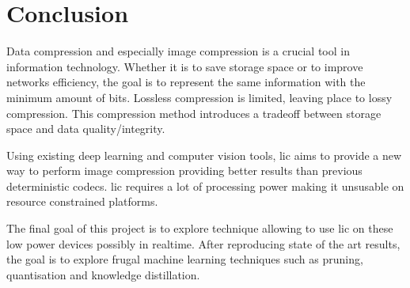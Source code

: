 \chapter*{Conclusion}
Data compression and especially image compression is a crucial tool in information technology. Whether it is to save storage space or to improve networks efficiency, the goal is to represent the same information with the minimum amount of bits. Lossless compression is limited, leaving place to lossy compression. This compression method introduces a tradeoff between storage space and data quality/integrity.

Using existing deep learning and computer vision tools, \acrfull{lic} aims to provide a new way to perform image compression providing better results than previous deterministic codecs. \acrshort{lic} requires a lot of processing power making it unsusable on resource constrained platforms.

The final goal of this project is to explore technique allowing to use \acrshort{lic} on these low power devices possibly in realtime. After reproducing state of the art results, the goal is to explore frugal machine learning techniques such as pruning, quantisation and knowledge distillation.